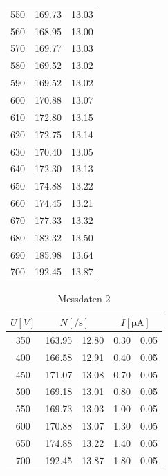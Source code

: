 \begin{table}[H]
\begin{tabular}{c c @{${}\pm{}$} c}
          550 &  169.73 &  13.03\\
          560 &  168.95 &  13.00\\
          570 &  169.77 &  13.03\\
          580 &  169.52 &  13.02\\
          590 &  169.52 &  13.02\\
          600 &  170.88 &  13.07\\
          610 &  172.80 &  13.15\\
          620 &  172.75 &  13.14\\
          630 &  170.40 &  13.05\\
          640 &  172.30 &  13.13\\
          650 &  174.88 &  13.22\\
          660 &  174.45 &  13.21\\
          670 &  177.33 &  13.32\\
          680 &  182.32 &  13.50\\
          690 &  185.98 &  13.64\\
          700 &  192.45 &  13.87\\
          \bottomrule
        \end{tabular}
      \end{table}

\begin{table}[H]
  \centering
      \caption{Messdaten 2}
      \label{tab:mess2}
      \begin{tabular}{c c @{${}\pm{}$} c c @{${}\pm{}$} c}
        \toprule
        {$U [\si{V}]$} & 
        \multicolumn{2}{c}{$N [\si{\per\second}]$}  & 
        \multicolumn{2}{c}{$I [\si{\micro\ampere}]$}\\
        \midrule
        350 & 163.95 & 12.80 & 0.30 & 0.05\\
        400 & 166.58 & 12.91 & 0.40 & 0.05\\
        450 & 171.07 & 13.08 & 0.70 & 0.05\\
        500 & 169.18 & 13.01 & 0.80 & 0.05\\
        550 & 169.73 & 13.03 & 1.00 & 0.05\\
        600 & 170.88 & 13.07 & 1.30 & 0.05\\
        650 & 174.88 & 13.22 & 1.40 & 0.05\\
        700 & 192.45 & 13.87 & 1.80 & 0.05\\
        \bottomrule
      \end{tabular}
    \end{table}
    
